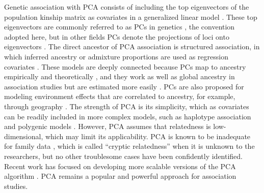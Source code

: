 \documentclass[11pt]{article}
\begin{document}
\begin{linenumbers}
Genetic association with PCA consists of including the top eigenvectors of the population kinship matrix as covariates in a generalized linear model \citep{zhang_semiparametric_2003, price_principal_2006, bouaziz_accounting_2011}.
These top eigenvectors are commonly referred to as PCs in genetics \citep{patterson_population_2006}, the convention adopted here, but in other fields PCs denote the projections of loci onto eigenvectors \citep{jolliffe_principal_2002}.
The direct ancestor of PCA association is structured association, in which inferred ancestry or admixture proportions are used as regression covariates \citep{pritchard_association_2000}.
These models are deeply connected because PCs map to ancestry empirically \citep{alexander_fast_2009, zhou_strong_2016} and theoretically \citep{mcvean_genealogical_2009,zheng_eigenanalysis_2016,cabreros_likelihood-free_2019,chiu_inferring_2022}, and they work as well as global ancestry in association studies but are estimated more easily \citep{patterson_population_2006, zhao_arabidopsis_2007, alexander_fast_2009, bouaziz_accounting_2011}.
PCs are also proposed for modeling environment effects that are correlated to ancestry, for example, through geography \citep{novembre_genes_2008, zhang_principal_2015, lin_admixed_2021}.
The strength of PCA is its simplicity, which as covariates can be readily included in more complex models, such as haplotype association \citep{xu_detecting_2014} and polygenic models \citep{qian_fast_2020}.
However, PCA assumes that relatedness is low-dimensional, which may limit its applicability.
PCA is known to be inadequate for family data \citep{patterson_population_2006, thornton_roadtrips:_2010, price_new_2010}, which is called ``cryptic relatedness'' when it is unknown to the researchers, but no other troublesome cases have been confidently identified.
Recent work has focused on developing more scalable versions of the PCA algorithm \citep{lee_sparse_2012, abraham_fast_2014, galinsky_fast_2016, abraham_flashpca2:_2017, agrawal_scalable_2020}.
PCA remains a popular and powerful approach for association studies.


\end{linenumbers}
\end{document}
